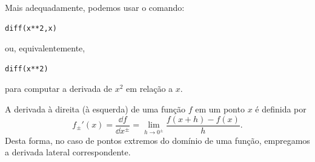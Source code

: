 \begin{ex}
  Mais adequadamente, podemos usar o comando:
\begin{verbatim}
diff(x**2,x)
\end{verbatim}
  ou, equivalentemente,
\begin{verbatim}
diff(x**2)
\end{verbatim}
  para computar a derivada de $x^2$ em relação a $x$.
  \fi
\end{ex}

\begin{obs}
  A derivada à direita (à esquerda) de uma função $f$ em um ponto $x$ é definida por
  \begin{equation}
    f_{\pm}'(x) = \frac{\dd f}{\dd x^{\pm}} = \lim_{h\to 0^\pm} \frac{f(x+h)-f(x)}{h}.
  \end{equation}
  Desta forma, no caso de pontos extremos do domínio de uma função, empregamos a derivada lateral correspondente.
\end{obs}

